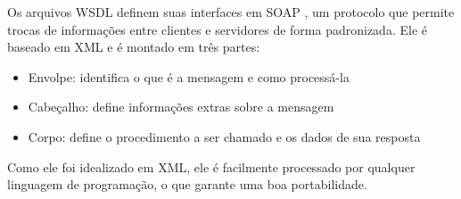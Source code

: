 Os arquivos WSDL definem suas interfaces em SOAP \cite{w3c-spec-soapspec}, um protocolo que permite trocas de informações entre clientes e servidores de forma padronizada. Ele é baseado em XML e é montado em três partes:
\begin{itemize}
  \item Envolpe: identifica o que é a mensagem e como processá-la
  \item Cabeçalho: define informações extras sobre a mensagem
  \item Corpo: define o procedimento a ser chamado e os dados de sua resposta
\end{itemize}

Como ele foi idealizado em XML, ele é facilmente processado por qualquer linguagem de programação, o que garante uma boa portabilidade.
